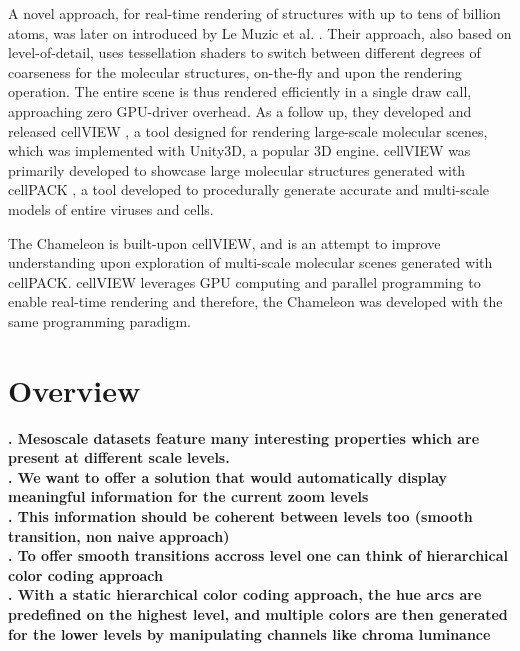 \documentclass[review,journal]{vgtc}         %
\begin{document}
A novel approach, for real-time rendering of structures with up to tens of billion atoms, was later on introduced by Le Muzic et al. \cite{le2014illustrative}. 
Their approach, also based on level-of-detail, uses tessellation shaders to switch between different degrees of coarseness for the molecular structures, on-the-fly and upon the rendering operation.
The entire scene is thus rendered efficiently in a single draw call, approaching zero GPU-driver overhead. 
As a follow up, they developed and released cellVIEW \cite{muzic2015cellview}, a tool designed for rendering large-scale molecular scenes, which was implemented with Unity3D, a popular 3D engine.
cellVIEW was primarily developed to showcase large molecular structures generated with cellPACK \cite{johnson2015cellpack}, a tool developed to procedurally generate accurate and multi-scale models of entire viruses and cells.

The Chameleon is built-upon cellVIEW, and is an attempt to improve understanding upon exploration of multi-scale molecular scenes generated with cellPACK.
cellVIEW leverages GPU computing and parallel programming to enable real-time rendering and therefore, the Chameleon was developed with the same programming paradigm.


\section{Overview}

\textbf{. Mesoscale datasets feature many interesting properties which are present at different scale levels. } \\

\textbf{. We want to offer a solution that would automatically display meaningful information for the current zoom levels} \\

\textbf{. This information should be coherent between levels too (smooth transition, non naive approach)} \\
	
\textbf{. To offer smooth transitions accross level one can think of hierarchical color coding approach} \\

\textbf{. With a static hierarchical color coding approach, the hue arcs are predefined on the highest level, and multiple colors are then generated for the lower levels by manipulating channels like chroma luminance} \\
\end{document}
